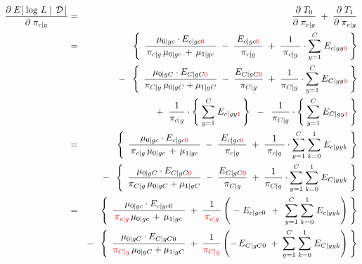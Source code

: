 \begin{eqnarray*}
\dfrac{\partial\;E\!\left[\,\left.\log\,L\;\right\vert\;\mathcal{D}\,\right]}{\partial\;\pi_{c \vert g}}
&=& \dfrac{\partial\;T_{0}}{\partial\;\pi_{c \vert g}} \;+\; \dfrac{\partial\;T_{1}}{\partial\;\pi_{c \vert g}}
\\
&=&
	{\color{white}-} \;\;
	\left\{\;\,
		\dfrac{\mu_{0 \vert gc}\cdot E_{c \vert gc{\color{red}0}}}{\mbox{}\,\pi_{c \vert g}\,\mu_{0 \vert gc} \,+\, \mu_{1\vert gc}\,\mbox{}}
		\;-\;
		\dfrac{\mbox{}\;E_{c \vert gc{\color{red}0}}\;\mbox{}}{\mbox{}\;\pi_{c \vert g}\;\mbox{}}
		\;+\;
		\dfrac{1}{\mbox{}\;\pi_{c \vert g}\;\mbox{}}
		\cdot
		\overset{C}{\underset{y=1}{\sum}}\; E_{c \vert gy{\color{red}0}}
	\;\right\}
\\
&&
	- \;\;
	\left\{\;\,
		\dfrac{\mu_{0 \vert gC} \cdot E_{C \vert gC{\color{red}0}}}{\pi_{C \vert g}\,\mu_{0 \vert gC}+\mu_{1\vert gC}}
		\;-\;
		\dfrac{E_{C \vert gC{\color{red}0}}}{\pi_{C \vert g}}
		\;+\;
		\dfrac{1}{\pi_{C \vert g}}
		\cdot
		\overset{C}{\underset{y=1}{\sum}}\; E_{C \vert gy{\color{red}0}}
	\;\right\}
\\
&&
	+ \;\;
	\dfrac{1}{\pi_{c \vert g}}
	\cdot
	\left\{\;
		\overset{C}{\underset{y=1}{\sum}}\;
		E_{c \vert gy{\color{red}1}}
	\,\right\}
	\;\; - \;\;
	\dfrac{1}{\pi_{C \vert g}}
	\cdot
	\left\{\;
		\overset{C}{\underset{y=1}{\sum}}\;
		E_{C \vert gy{\color{red}1}}
	\,\right\}
\\
&=&
	{\color{white}-} \;\;
	\left\{\;\,
		\dfrac{\mu_{0 \vert gc}\cdot E_{c \vert gc{\color{red}0}}}{\mbox{}\,\pi_{c \vert g}\,\mu_{0 \vert gc} \,+\, \mu_{1\vert gc}\,\mbox{}}
		\;-\;
		\dfrac{\mbox{}\;E_{c \vert gc{\color{red}0}}\;\mbox{}}{\mbox{}\;\pi_{c \vert g}\;\mbox{}}
		\;+\;
		\dfrac{1}{\mbox{}\;\pi_{c \vert g}\;\mbox{}}
		\cdot
		\overset{C}{\underset{y=1}{\sum}} \; \overset{1}{\underset{k=0}{\sum}} \; E_{c \vert gyk}
	\;\right\}
\\
&&
	- \;\;
	\left\{\;\,
		\dfrac{\mu_{0 \vert gC} \cdot E_{C \vert gC{\color{red}0}}}{\pi_{C \vert g}\,\mu_{0 \vert gC}+\mu_{1\vert gC}}
		\;-\;
		\dfrac{E_{C \vert gC{\color{red}0}}}{\pi_{C \vert g}}
		\;+\;
		\dfrac{1}{\pi_{C \vert g}}
		\cdot
		\overset{C}{\underset{y=1}{\sum}} \; \overset{1}{\underset{k=0}{\sum}} \; E_{C \vert gyk}
	\;\right\}
\\
&=&
	{\color{white}-} \;\;
	\left\{\;\,
		\dfrac{\mu_{0 \vert gc}\cdot E_{c \vert gc0}}{\mbox{}\,{\color{red}\pi_{c \vert g}}\,\mu_{0 \vert gc} \,+\, \mu_{1\vert gc}\;\mbox{}}
		\;+\;
		\dfrac{1}{\mbox{}\,{\color{red}\pi_{c \vert g}}\,\mbox{}}
		\left(
			\;-\;E_{c \vert gc0}
			\,\;+\;\,
			\overset{C}{\underset{y=1}{\sum}} \; \overset{1}{\underset{k=0}{\sum}} \; E_{c \vert gyk}
		\right)
	\;\right\}
\\
&&
	- \;\;
	\left\{\;\,
		\dfrac{\mu_{0 \vert gC} \cdot E_{C \vert gC0}}{{\color{red}\pi_{C \vert g}}\,\mu_{0 \vert gC}+\mu_{1\vert gC}}
		\;+\;
		\dfrac{1}{{\color{red}\pi_{C \vert g}}}
		\left(
			-\,E_{C \vert gC0}
			\;+\;
			\overset{C}{\underset{y=1}{\sum}} \; \overset{1}{\underset{k=0}{\sum}} \; E_{C \vert gyk}
		\right)
	\;\right\}
\end{eqnarray*}

